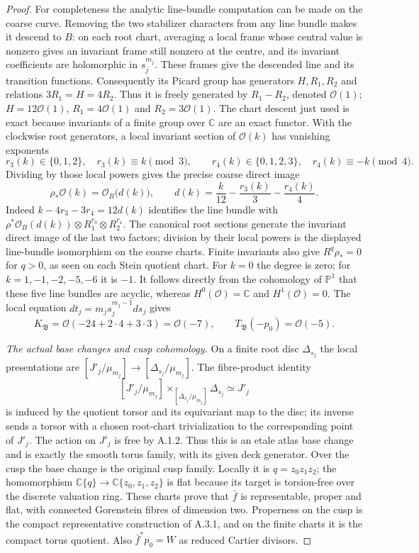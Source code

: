 \begin{proof}
For completeness the analytic line-bundle computation can be made on
the coarse curve. Removing the two stabilizer characters from any line
bundle makes it descend to $B$: on each root chart, averaging a local
frame whose central value is nonzero gives an invariant frame still
nonzero at the centre, and its invariant coefficients are holomorphic
in $s_j^{m_j}$. These frames give the descended line and its transition
functions. Consequently its Picard group has
generators $H,R_1,R_2$ and relations $3R_1=H=4R_2$.
Thus it is freely generated by $R_1-R_2$, denoted $\mathcal O(1)$;
$H=12\mathcal O(1)$, $R_1=4\mathcal O(1)$ and
$R_2=3\mathcal O(1)$. The chart descent just used is exact because
invariants of a finite group over $\mathbb C$ are an exact functor.
With the clockwise root generators, a local invariant section of
$\mathcal O(k)$ has vanishing exponents
\[
 r_3(k)\in\{0,1,2\},\quad r_3(k)\equiv k\pmod3,
 \qquad
 r_4(k)\in\{0,1,2,3\},\quad r_4(k)\equiv-k\pmod4.
\]
Dividing by those local powers gives the precise coarse direct image
\begin{equation}\label{fam:eq:ab-root-degree}
 \rho_*\mathcal O(k)=\mathcal O_B\bigl(d(k)\bigr),\qquad
 d(k)=\frac{k}{12}-\frac{r_3(k)}3-\frac{r_4(k)}4.
\end{equation}
Indeed $k-4r_3-3r_4=12d(k)$ identifies the line bundle with
$\rho^*\mathcal O_B(d(k))\otimes R_1^{r_3}\otimes R_2^{r_4}$.
The canonical root sections generate the invariant direct image of
the last two factors; division by their local powers is the displayed
line-bundle isomorphism on the coarse charts. Finite invariants also give
$R^q\rho_*=0$ for $q>0$, as seen on each Stein quotient chart.
For $k=0$ the degree is zero; for
$k=1,-1,-2,-5,-6$ it is $-1$. It follows directly from the
cohomology of $\mathbb P^1$ that these five line bundles are acyclic,
whereas $H^0(\mathcal O)=\mathbb C$ and $H^1(\mathcal O)=0$.
The local equation $dt_j=m_js_j^{m_j-1}ds_j$ gives
\[
 K_{\mathfrak B}=\mathcal O(-24+2\cdot4+3\cdot3)
 =\mathcal O(-7),\qquad
 T_{\mathfrak B}(-p_0)=\mathcal O(-5).
\]

\emph{The actual base changes and cusp cohomology.}
On a finite root disc $\Delta_{s_j}$ the local presentations are
$[J'_j/\mu_{m_j}]\to[\Delta_{s_j}/\mu_{m_j}]$.
The fibre-product identity
\[
 [J'_j/\mu_{m_j}]
 \mathbin{\times_{[\Delta_{s_j}/\mu_{m_j}]}}\Delta_{s_j}
 \simeq J'_j
\]
is induced by the quotient torsor and its equivariant map to the disc;
its inverse sends a torsor with a chosen root-chart trivialization to
the corresponding point of $J'_j$. The action on $J'_j$ is free by
A.1.2. Thus this is an etale atlas base change and is exactly the
smooth torus family, with its given deck generator. Over the cusp the
base change is the original cusp family. Locally it is
$q=z_0z_1z_2$; the homomorphism
$\mathbb C\{q\}\to\mathbb C\{z_0,z_1,z_2\}$ is flat because its
target is torsion-free over the discrete valuation ring.
These charts prove that $\bar f$ is representable, proper and flat,
with connected Gorenstein fibres of dimension two. Properness on the
cusp is the compact representative construction of A.3.1, and on the
finite charts it is the compact torus quotient. Also
$\bar f^*p_0=W$ as reduced Cartier divisors.


\end{proof}
